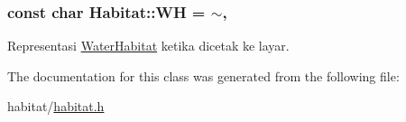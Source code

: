 \subsubsection[{\texorpdfstring{WH}{WH}}]{\setlength{\rightskip}{0pt plus 5cm}const char Habitat\+::\+WH = \textquotesingle{}$\sim$\textquotesingle{}\hspace{0.3cm}{\ttfamily [static]}, {\ttfamily [protected]}}\hypertarget{classHabitat_aeba269066b13b0f7b632526af4d547d3}{}\label{classHabitat_aeba269066b13b0f7b632526af4d547d3}


Representasi \hyperlink{classWaterHabitat}{Water\+Habitat} ketika dicetak ke layar. 



The documentation for this class was generated from the following file\+:\begin{DoxyCompactItemize}
\item 
habitat/\hyperlink{habitat_8h}{habitat.\+h}\end{DoxyCompactItemize}
